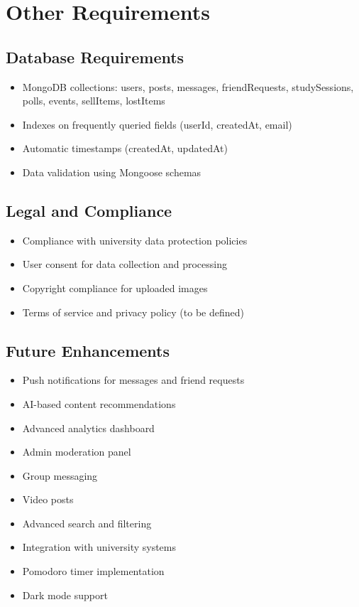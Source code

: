 \documentclass[12pt,a4paper]{article}
\begin{document}
\section{Other Requirements}

\subsection{Database Requirements}
\begin{itemize}
    \item MongoDB collections: users, posts, messages, friendRequests, studySessions, polls, events, sellItems, lostItems
    \item Indexes on frequently queried fields (userId, createdAt, email)
    \item Automatic timestamps (createdAt, updatedAt)
    \item Data validation using Mongoose schemas
\end{itemize}

\subsection{Legal and Compliance}
\begin{itemize}
    \item Compliance with university data protection policies
    \item User consent for data collection and processing
    \item Copyright compliance for uploaded images
    \item Terms of service and privacy policy (to be defined)
\end{itemize}

\subsection{Future Enhancements}
\begin{itemize}
    \item Push notifications for messages and friend requests
    \item AI-based content recommendations
    \item Advanced analytics dashboard
    \item Admin moderation panel
    \item Group messaging
    \item Video posts
    \item Advanced search and filtering
    \item Integration with university systems
    \item Pomodoro timer implementation
    \item Dark mode support
\end{itemize}
\end{document}
